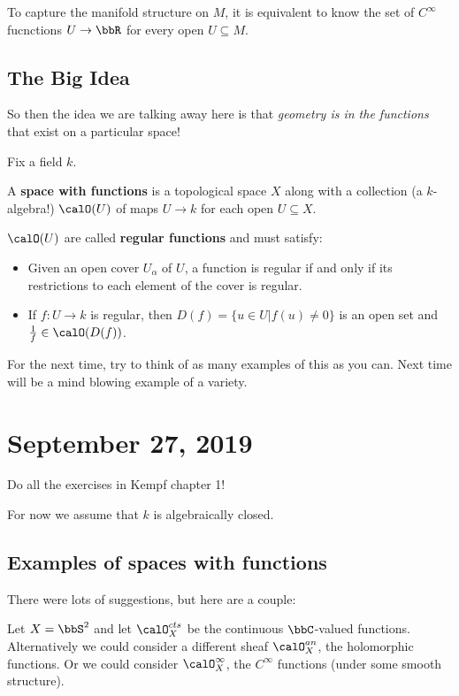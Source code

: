 \documentclass[12pt]{article}
\begin{document}
To capture the manifold structure on $M$, it is equivalent to know the set of $C^\infty$ fucnctions $U\to \bbR$ for every open $U\subseteq M$.

\subsection{The Big Idea}
So then the idea we are talking away here is that \textit{geometry is in the functions} that exist on a particular space!

Fix a field $k$. 
\begin{defn}
	A \textbf{space with functions} is a topological space $X$ along with a collection (a $k$-algebra!) $\calO(U)$ of maps $U\to k$ for each open 
	$U\subseteq X$. 

	$\calO(U)$ are called \textbf{regular functions} and must satisfy:
	\begin{itemize}
		\item Given an open cover $U_\alpha$ of $U$, a function is regular if and only if its restrictions to each element of the cover is regular.
		\item If $f:U\to k$ is regular, then $D(f)=\{u\in U|f(u)\ne 0\}$ is an open set and $\frac{1}{f}\in\calO(D(f))$.
	\end{itemize}
\end{defn}

For the next time, try to think of as many examples of this as you can. Next time will be a mind blowing example of a variety.

\section{September 27, 2019}
\begin{prob}
	Do all the exercises in Kempf chapter 1!
\end{prob}

For now we assume that $k$ is algebraically closed.

\subsection{Examples of spaces with functions}
There were lots of suggestions, but here are a couple:
\begin{ex}
	Let $X=\bbS^2$ and let $\calO_X^{cts}$ be the continuous $\bbC$-valued functions. Alternatively
	we could consider a different sheaf $\calO_X^{an}$, the holomorphic functions. Or we could 
	consider $\calO_X^\infty$, the $C^\infty$ functions (under some smooth structure).
\end{ex}
\end{document}
